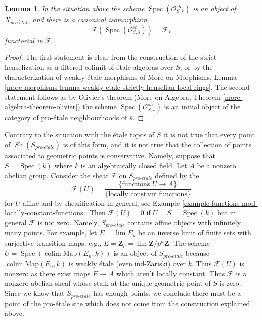 \documentclass{stacks-project}
\theoremstyle{plain}
\newtheorem{lemma}[subsection]{Lemma}
\theoremstyle{definition}
\theoremstyle{remark}
\numberwithin{equation}{subsection}
\def\lim{\mathop{\mathrm{lim}}\nolimits}
\def\colim{\mathop{\mathrm{colim}}\nolimits}
\def\Spec{\mathop{\mathrm{Spec}}}
\def\Sh{\mathop{\mathit{Sh}}\nolimits}
\def\proetale{{pro\text{-}\acute{e}tale}}
\begin{document}
\begin{lemma}
\label{lemma-classical-point}
In the situation above the scheme $\Spec(\mathcal{O}_{S, \overline{s}}^{sh})$
is an object of $X_\proetale$ and there is a canonical isomorphism
$$
\mathcal{F}(\Spec(\mathcal{O}_{S, \overline{s}}^{sh})) =
\mathcal{F}_{\overline{s}}
$$
functorial in $\mathcal{F}$.
\end{lemma}

\begin{proof}
The first statement is clear from the construction of the strict henselization
as a filtered colimit of \'etale algebras over $S$, or by the characterization
of weakly \'etale morphisms of
More on Morphisms, Lemma
\ref{more-morphisms-lemma-weakly-etale-strictly-henselian-local-rings}.
The second statement follows as by Olivier's theorem
(More on Algebra, Theorem \ref{more-algebra-theorem-olivier})
the scheme $\Spec(\mathcal{O}_{S, \overline{s}}^{sh})$
is an initial object of the category of pro-\'etale neighbourhoods
of $\overline{s}$.
\end{proof}

\noindent
Contrary to the situation with the \'etale topos of $S$ it is not true
that every point of $\Sh(S_\proetale)$ is of this form, and it is not
true that the collection of points associated to geometric points is
conservative. Namely, suppose that $S = \Spec(k)$ where $k$ is an
algebraically closed field. Let $A$ be a nonzero abelian group.
Consider the sheaf $\mathcal{F}$ on $S_\proetale$ defined by the
$$
\mathcal{F}(U) =
\frac{\{\text{functions }U \to A\}}{\{\text{locally constant functions}\}}
$$
for $U$ affine and by sheafification in general, see
Example \ref{example-functions-mod-locally-constant-functions}.
Then $\mathcal{F}(U) = 0$ if $U = S = \Spec(k)$ but in general $\mathcal{F}$
is not zero. Namely, $S_\proetale$ contains affine objects
with infinitely many points. For example, let $E = \lim E_n$
be an inverse limit of finite sets with surjective transition maps,
e.g., $E = \mathbf{Z}_p = \lim \mathbf{Z}/p^n\mathbf{Z}$. The scheme
$U = \Spec(\colim \text{Map}(E_n, k))$ is an object of $S_\proetale$
because $\colim \text{Map}(E_n, k)$ is weakly \'etale (even ind-Zariski)
over $k$. Thus $\mathcal{F}(U)$ is nonzero as there exist maps $E \to A$
which aren't locally constant.
Thus $\mathcal{F}$ is a nonzero abelian sheaf whose stalk at the
unique geometric point of $S$ is zero. Since we know that $S_\proetale$
has enough points, we conclude there must be a point of the pro-\'etale
site which does not come from the construction explained above.
\end{document}
